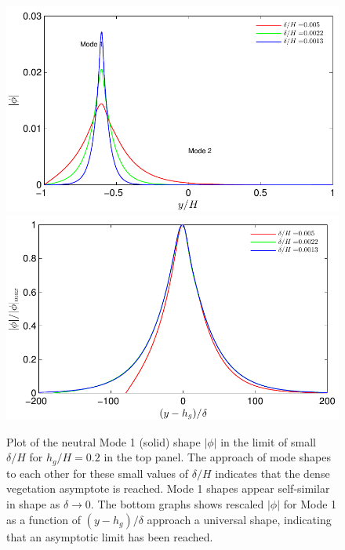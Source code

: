 \documentclass[12pt]{report}   %
\newcommand{\hg}{h_g}
\newcommand{\Rey}{{R}}
\newcommand{\Ndg}{\tilde{N}_g}
\begin{document}

\begin{figure}
{\includegraphics[scale=1.1]{Asymptotic_noshear}}\\
 \includegraphics[scale=1.1]{Asymptotic_noshear2}
\caption{
Plot of the neutral Mode 1 (solid) shape $|\phi|$ in the limit of small $\delta/H$ for $\hg/H=0.2$ in the top panel.
The approach of mode shapes to each other for these small values of $\delta/H$ indicates that the dense vegetation asymptote is reached. 
Mode 1 shapes appear self-similar in shape as $\delta\to 0$.
The bottom graphs shows rescaled $|\phi|$ for Mode 1 as a function of $(y-\hg)/\delta$ approach a universal shape, indicating that an asymptotic limit has been reached. 
}
\label{Asymptotic_mode}
\end{figure}
\end{document}
